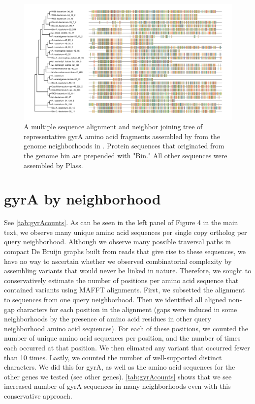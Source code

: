 \begin{figure}
 \centering
 \includegraphics[width=\linewidth]{gyrA-cdhit95-msa}
	\caption{A multiple sequence alignment and neighbor joining tree of representative gyrA amino acid fragments assembled by \plass from the genome neighborhoods in \hu. Protein sequences that originated from the genome bin are prepended with "Bin." All other sequences were assembled by Plass.
 }
 \label{fig:gyrAalign}
\end{figure}

\section{gyrA by neighborhood}
\label{subsec:gyrAnbhd}

See \autoref{tab:gyrAcounts}. As can be seen in the left panel of Figure 4 in the
main text, we observe many unique amino acid sequences per single copy ortholog
per query neighborhood.
Although we observe many possible traversal paths in compact De Bruijn graphs built
from reads that give rise to these sequences, we have no way to ascertain whether we
observed combinatorial complexity by assembling variants that would never be linked
in nature. Therefore, we sought to conservatively estimate the number of positions
per amino acid sequence that contained variants using MAFFT alignments. First, we
subsetted the alignment to sequences from one query neighborhood. Then we identified
all aligned non-gap characters for each position in the alignment (gaps were induced
in some neighborhoods by the presence of amino acid residues in other query neighborhood
amino acid sequences). For each of these positions, we counted the number of unique
amino acid sequences per position, and the number of times each occurred at that position.
We then elimated any variant that occurred fewer than 10 times. Lastly, we counted the
number of well-supported distinct characters. We did this for gyrA, as well as the
amino acid sequences for the other genes we tested (see other genes). \autoref{tab:gyrAcounts}
shows that we see increased number of gyrA sequences in many neighborhoods even with
this conservative approach.

